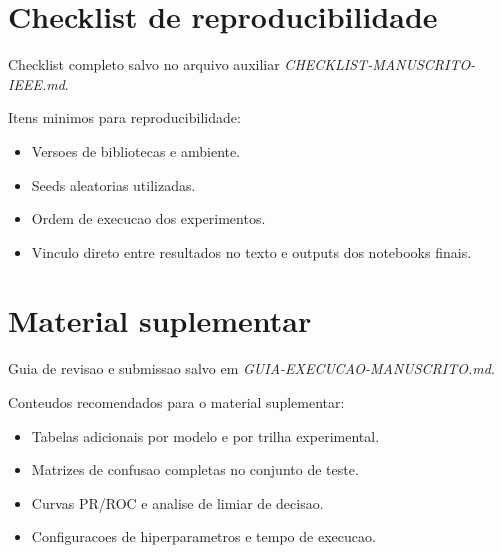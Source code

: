 \documentclass[conference]{IEEEtran}
\begin{document}
\appendix
\section{Checklist de reproducibilidade}
Checklist completo salvo no arquivo auxiliar \textit{CHECKLIST-MANUSCRITO-IEEE.md}.

Itens minimos para reproducibilidade:
\begin{itemize}[leftmargin=*]
    \item Versoes de bibliotecas e ambiente.
    \item Seeds aleatorias utilizadas.
    \item Ordem de execucao dos experimentos.
    \item Vinculo direto entre resultados no texto e outputs dos notebooks finais.
\end{itemize}

\section{Material suplementar}
Guia de revisao e submissao salvo em \textit{GUIA-EXECUCAO-MANUSCRITO.md}.

Conteudos recomendados para o material suplementar:
\begin{itemize}[leftmargin=*]
    \item Tabelas adicionais por modelo e por trilha experimental.
    \item Matrizes de confusao completas no conjunto de teste.
    \item Curvas PR/ROC e analise de limiar de decisao.
    \item Configuracoes de hiperparametros e tempo de execucao.
\end{itemize}
\end{document}
